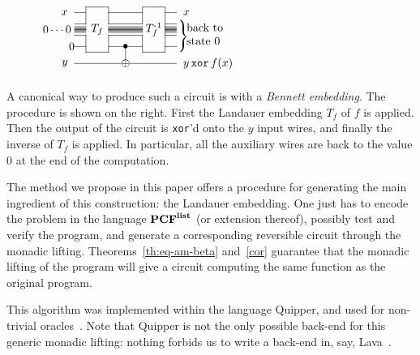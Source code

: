 \documentclass{article}
\theoremstyle{plain}
\theoremstyle{definition}
\newcommand{\PCF}{\mbox{${\bf PCF}^{\bf list}$}}
\begin{document}
\begin{wrapfigure}{r}{0.4\textwidth}
\vspace{-30pt}
\begin{minipage}{0.39\textwidth}
\scriptsize$
\begin{array}{@{}c@{}}
\xy
0;<1em,0em>:
(0,0.5);(2,0.5)**\dir{-};
(2,2)**\dir{-};
(2,3)**\dir{.};
(2,4.5)**\dir{-};
(0,4.5)**\dir{-};
(0,3)**\dir{-};
(0,2)**\dir{.};
(0,0.5)**\dir{-};
(1,2.5)*{T_f};
(0,1);(-1,1)*!R{{0}}**\dir{-};
(0,4);(-1,4)*++!R{x}**\dir{-};
(2,1);(3.5,1)*{\bullet}="a"**\dir{-};(5,1)**\dir{-};
(2,4);(5,4)**\dir{-};
(7,4);(8,4)*++!L{x}**\dir{-};
(-1,2.5)*+!R{{0\cdots0}};
(5,0.5);(7,0.5)**\dir{-};
(7,2)**\dir{-};
(7,2)**\dir{.};
(7,4.5)**\dir{-};
(5,4.5)**\dir{-};
(5,3)**\dir{-};
(5,2)**\dir{.};
(5,0.5)**\dir{-};
(6,2.5)*{T_f^{\textrm{-}1}};
(7,1);(8,1)**\dir{-};
(-1,-0.5)*++!R{y};(3.5,-0.5)*{\oplus}="b"**\dir{-};(8,-0.5)*++!L{y\,
  {\tt xor}\, f(x)}**\dir{-}
\multiline{0}{2}{-1}{}
\multiline{2}{2}{5}{}
\multiline{7}{2}{8}{}
\save
(8.3,3).(8.3,1)!C*+\frm{\}}
\restore
\save
"a";"b"**\dir{-};
(8,2)*+++!L{\begin{array}{@{}l@{}}\textrm{back to}\\\textrm{state $0$}\end{array}}
\restore
\endxy
\end{array}
$
\end{minipage}
\vspace{-20pt}
\end{wrapfigure}
A canonical way to produce such a circuit is with a {\em Bennett
  embedding}. The procedure is shown on the right. First the
Landauer embedding $T_f$ of $f$ is applied. Then the output of the
circuit is {\tt xor}'d onto the $y$ input wires, and finally the
inverse of $T_f$ is applied. In particular, all the auxiliary wires
are back to the value $0$ at the end of the computation.

The method we propose in this paper offers a procedure for generating
the main ingredient of this construction: the Landauer embedding.
One just has to encode the problem in the language $\PCF$ (or
extension thereof), possibly test and verify the program, and generate
a corresponding reversible circuit through the monadic lifting.
Theorems~\ref{th:eq-am-beta} and~\ref{cor} guarantee that
the monadic lifting of the program will give a circuit computing
the same function as the original program.

This algorithm was implemented within the language Quipper, and used
for non-trivial oracles~\cite{Quipper,PLDI}. Note that Quipper is not
the only possible back-end for this generic monadic lifting: nothing forbids us
to write a back-end in, say, Lava~\cite{Claessen-2001}.
\end{document}
